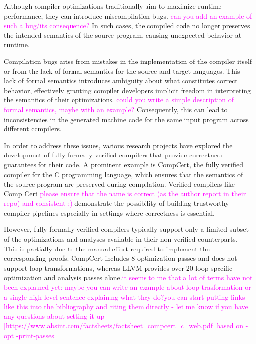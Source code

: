 Although compiler optimizations traditionally aim to maximize runtime performance, they can introduce miscompilation bugs. \textcolor{magenta}{can you add an example of such a bug/its consequence?} In such cases, the compiled code no longer preserves the intended semantics of the source program, causing unexpected behavior at runtime.

Compilation bugs arise from mistakes in the implementation of the compiler itself or from the lack of formal semantics for the source and target languages. This lack of formal semantics introduces ambiguity about what constitutes correct behavior,  effectively granting compiler developers implicit freedom in interpreting the semantics of their optimizations. \textcolor{magenta}{could you write a simple description of formal semantics, maybe with an example?} Consequently, this can lead to inconsistencies in the generated machine code for the same input program across different compilers.

In order to address these issues, various research projects have explored the development of fully formally verified compilers that provide correctness guarantees for their code. A prominent example is CompCert, the fully verified compiler for the C programming language, which ensures that the semantics of the source program are preserved during compilation. Verified compilers like Comp Cert\textcolor{magenta}{ please ensure that the name is correct (as the author report in their repo) and consistent :)} demonstrate the possibility of building trustworthy compiler pipelines especially in settings where correctness is essential.  

However, fully formally verified compilers typically support only a limited subset of the optimizations and analyses available in their non-verified counterparts. This is partially due to the manual effort required to implement the corresponding proofs. CompCert includes 8 optimization passes and does not support loop transformations, whereas LLVM provides over 20 loop-specific optimization and analysis passes alone.\textcolor{magenta}{it seems to me that a lot of terms have not been explained yet: maybe you can write an example about loop trasformation or a single high level sentence explaining what they do?}\textcolor{magenta}{you can start putting links like this into the bibliography and citing them directly - let me know if you have any questions about setting it up [https://www.absint.com/factsheets/factsheet\_compcert\_c\_web.pdf][based on -opt -print-passes]}

